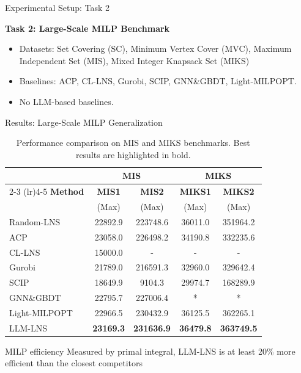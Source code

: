 \documentclass{beamer}
\begin{document}
	\begin{frame}{Experimental Setup: Task 2}
 
		
	\textbf{Task 2: Large-Scale MILP Benchmark}  		\begin{itemize}
			\item Datasets: Set Covering (SC), Minimum Vertex Cover (MVC), Maximum Independent Set (MIS), Mixed Integer Knapsack Set (MIKS) 
		 
			\item Baselines: ACP, CL-LNS, Gurobi, SCIP, GNN\&GBDT, Light-MILPOPT.
			\item No LLM-based baselines.
\end{itemize} 
                                	\end{frame}	
	\begin{frame}{Results: Large-Scale MILP Generalization}
\begin{table}[h]
    \centering
    \begin{tabular}{l cccc}
        \toprule
        & \multicolumn{2}{c}{\textbf{MIS}} & \multicolumn{2}{c}{\textbf{MIKS}} \\
        \cmidrule(lr){2-3} \cmidrule(lr){4-5}
        \textbf{Method} & \textbf{MIS1} & \textbf{MIS2} & \textbf{MIKS1} & \textbf{MIKS2} \\
        & (Max) & (Max) & (Max) & (Max) \\
        \midrule
        Random-LNS    & 22892.9 & 223748.6 & 36011.0 & 351964.2 \\
        ACP           & 23058.0 & 226498.2 & 34190.8 & 332235.6 \\
        CL-LNS        & 15000.0 & -        & -       & -        \\
        Gurobi        & 21789.0 & 216591.3 & 32960.0 & 329642.4 \\
        SCIP          & 18649.9 & 9104.3   & 29974.7 & 168289.9 \\
        GNN\&GBDT     & 22795.7 & 227006.4 & * & * \\
        Light-MILPOPT & 22966.5 & 230432.9 & 36125.5 & 362265.1 \\
        LLM-LNS  & \textbf{23169.3} & \textbf{231636.9} & \textbf{36479.8} & \textbf{363749.5} \\
        \bottomrule
    \end{tabular}
    \caption{Performance comparison on MIS and MIKS benchmarks. Best results are highlighted in bold.}
    \label{tab:milp_benchmark_results_subset}
\end{table}
		
	
	\end{frame}
\begin{frame}{MILP efficiency}
Measured by primal integral, LLM-LNS is at least 20\% more efficient than the closest competitors
		
\end{frame}
	
\end{document}
